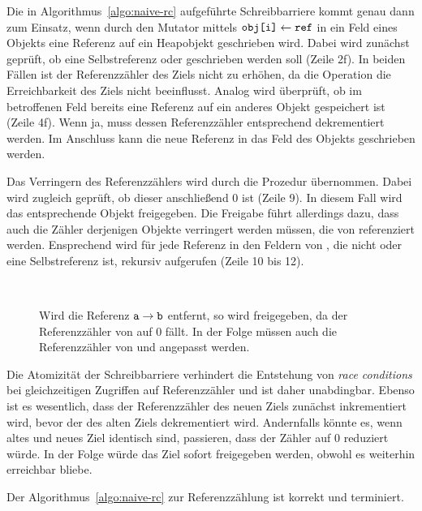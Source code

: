 Die in Algorithmus~\ref{algo:naive-rc} aufgeführte Schreibbarriere kommt genau dann zum Einsatz, wenn durch den Mutator mittels $\texttt{obj[i]} \gets \texttt{ref}$ in ein Feld eines Objekts eine Referenz auf ein Heapobjekt geschrieben wird.
Dabei wird zunächst geprüft, ob eine Selbstreferenz oder \Null geschrieben werden soll (Zeile 2f).
In beiden Fällen ist der Referenzzähler des Ziels nicht zu erhöhen, da die Operation die Erreichbarkeit des Ziels nicht beeinflusst.
Analog wird überprüft, ob im betroffenen Feld bereits eine Referenz auf ein anderes Objekt gespeichert ist (Zeile 4f).
Wenn ja, muss dessen Referenzzähler entsprechend dekrementiert werden.
Im Anschluss kann die neue Referenz in das Feld des Objekts geschrieben werden.

Das Verringern des Referenzzählers wird durch die Prozedur  übernommen.
Dabei wird zugleich geprüft, ob dieser anschließend $0$ ist (Zeile 9).
In diesem Fall wird das entsprechende Objekt  freigegeben.
Die Freigabe führt allerdings dazu, dass auch die Zähler derjenigen Objekte verringert werden müssen, die von  referenziert werden.
Ensprechend wird für jede Referenz in den Feldern von , die nicht \Null oder eine Selbstreferenz ist,  rekursiv aufgerufen (Zeile 10 bis 12).

\begin{figure}[h]
	\centering
	~\hspace{1cm}~
	
	\caption[Beispiel für Referenzzählung]{Wird die Referenz $\texttt{a} \rightarrow \texttt{b}$ entfernt, so wird  freigegeben, da der Referenzzähler von  auf $0$ fällt. In der Folge müssen auch die Referenzzähler von  und  angepasst werden.}
	\label{fig:rc-example}
\end{figure}

Die Atomizität der Schreibbarriere verhindert die Entstehung von \textit{race conditions} bei gleichzeitigen Zugriffen auf Referenzzähler und ist daher unabdingbar.
Ebenso ist es wesentlich, dass der Referenzzähler des neuen Ziels zunächst inkrementiert wird, bevor der des alten Ziels dekrementiert wird.
Andernfalls könnte es, wenn altes und neues Ziel identisch sind, passieren, dass der Zähler auf $0$ reduziert würde.
In der Folge würde das Ziel sofort freigegeben werden, obwohl es weiterhin erreichbar bliebe.

\begin{mybox}
\begin{satz}[]
\label{satz:rc-correctness}
	Der Algorithmus~\ref{algo:naive-rc} zur Referenzzählung ist korrekt und terminiert.
\end{satz}
\end{mybox}

